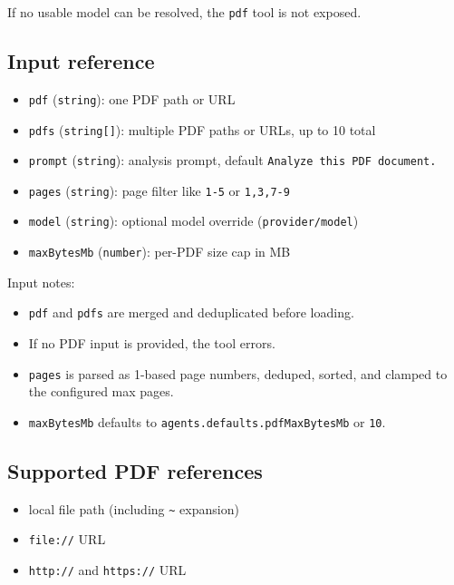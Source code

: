 If no usable model can be resolved, the \texttt{pdf} tool is not exposed.

\subsection{Input reference}


\begin{itemize}
  \item \texttt{pdf} (\texttt{string}): one PDF path or URL
  \item \texttt{pdfs} (\texttt{string[]}): multiple PDF paths or URLs, up to 10 total
  \item \texttt{prompt} (\texttt{string}): analysis prompt, default \texttt{Analyze this PDF document.}
  \item \texttt{pages} (\texttt{string}): page filter like \texttt{1-5} or \texttt{1,3,7-9}
  \item \texttt{model} (\texttt{string}): optional model override (\texttt{provider/model})
  \item \texttt{maxBytesMb} (\texttt{number}): per-PDF size cap in MB
\end{itemize}


Input notes:

\begin{itemize}
  \item \texttt{pdf} and \texttt{pdfs} are merged and deduplicated before loading.
  \item If no PDF input is provided, the tool errors.
  \item \texttt{pages} is parsed as 1-based page numbers, deduped, sorted, and clamped to the configured max pages.
  \item \texttt{maxBytesMb} defaults to \texttt{agents.defaults.pdfMaxBytesMb} or \texttt{10}.
\end{itemize}


\subsection{Supported PDF references}


\begin{itemize}
  \item local file path (including \texttt{\textasciitilde{}} expansion)
  \item \texttt{file://} URL
  \item \texttt{http://} and \texttt{https://} URL
\end{itemize}



